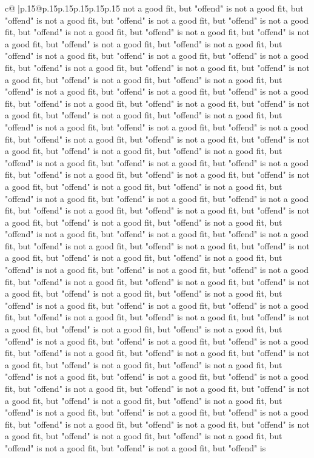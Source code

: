 \documentclass{article}
\begin{document}
{\begin{supertabular}{c@{$\;$}|p{.15\linewidth}@{}p{.15\linewidth}p{.15\linewidth}p{.15\linewidth}p{.15\linewidth}p{.15\linewidth}}
{{{not a good fit, but "offend" is not a good fit, but "offend" is not a good fit, but "offend" is not a good fit, but "offend" is not a good fit, but "offend" is not a good fit, but "offend" is not a good fit, but "offend" is not a good fit, but "offend" is not a good fit, but "offend" is not a good fit, but "offend" is not a good fit, but "offend" is not a good fit, but "offend" is not a good fit, but "offend" is not a good fit, but "offend" is not a good fit, but "offend" is not a good fit, but "offend" is not a good fit, but "offend" is not a good fit, but "offend" is not a good fit, but "offend" is not a good fit, but "offend" is not a good fit, but "offend" is not a good fit, but "offend" is not a good fit, but "offend" is not a good fit, but "offend" is not a good fit, but "offend" is not a good fit, but "offend" is not a good fit, but "offend" is not a good fit, but "offend" is not a good fit, but "offend" is not a good fit, but "offend" is not a good fit, but "offend" is not a good fit, but "offend" is not a good fit, but "offend" is not a good fit, but "offend" is not a good fit, but "offend" is not a good fit, but "offend" is not a good fit, but "offend" is not a good fit, but "offend" is not a good fit, but "offend" is not a good fit, but "offend" is not a good fit, but "offend" is not a good fit, but "offend" is not a good fit, but "offend" is not a good fit, but "offend" is not a good fit, but "offend" is not a good fit, but "offend" is not a good fit, but "offend" is not a good fit, but "offend" is not a good fit, but "offend" is not a good fit, but "offend" is not a good fit, but "offend" is not a good fit, but "offend" is not a good fit, but "offend" is not a good fit, but "offend" is not a good fit, but "offend" is not a good fit, but "offend" is not a good fit, but "offend" is not a good fit, but "offend" is not a good fit, but "offend" is not a good fit, but "offend" is not a good fit, but "offend" is not a good fit, but "offend" is not a good fit, but "offend" is not a good fit, but "offend" is not a good fit, but "offend" is not a good fit, but "offend" is not a good fit, but "offend" is not a good fit, but "offend" is not a good fit, but "offend" is not a good fit, but "offend" is not a good fit, but "offend" is not a good fit, but "offend" is not a good fit, but "offend" is not a good fit, but "offend" is not a good fit, but "offend" is not a good fit, but "offend" is not a good fit, but "offend" is not a good fit, but "offend" is not a good fit, but "offend" is not a good fit, but "offend" is not a good fit, but "offend" is not a good fit, but "offend" is not a good fit, but "offend" is not a good fit, but "offend" is not a good fit, but "offend" is not a good fit, but "offend" is not a good fit, but "offend" is not a good fit, but "offend" is not a good fit, but "offend" is not a good fit, but "offend" is not a good fit, but "offend" is not a good fit, but "offend" is not a good fit, but "offend" is not a good fit, but "offend" is not a good fit, but "offend" is not a good fit, but "offend" is not a good fit, but "offend" is not a good fit, but "offend" is not a good fit, but "offend" is not a good fit, but "offend" is }}}
\end{supertabular}}
\end{document}
